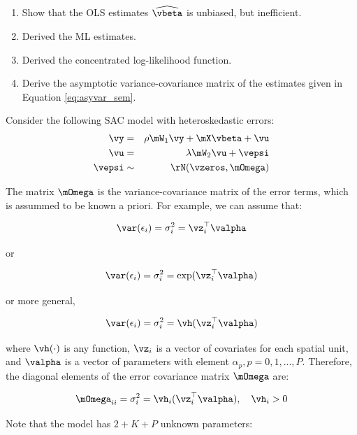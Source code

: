 \begin{exercises}
	\begin{enumerate}
	  \item Show that the OLS estimates $\widehat{\vbeta}$ is unbiased, but inefficient.
	  \item Derived the ML estimates.
	  \item Derived the concentrated log-likelihood function.
	  \item Derive the asymptotic variance-covariance matrix of the estimates given in Equation \eqref{eq:asyvar_sem}.
	\end{enumerate}
 
 \exercise  Consider the following SAC model with heteroskedastic errors:
 	\begin{eqnarray}
		\vy    & = & \rho \mW_1\vy + \mX\vbeta + \vu \\
		\vu & = &\lambda\mW_2\vu + \vepsi \\
		\vepsi & \sim &\rN(\vzeros, \mOmega)
	\end{eqnarray}
	
	The matrix $\mOmega$ is the variance-covariance matrix of the error terms, which is assummed to be known a priori. For example, we can assume that:
	
	\begin{equation}
		\var(\epsilon_i) = \sigma^2_i = \vz_i^\top\valpha
	\end{equation}
	
	or
	
	\begin{equation}
		\var(\epsilon_i) = \sigma^2_i = \exp(\vz_i^\top\valpha)
	\end{equation}
	
	or more general,
	
	\begin{equation}
		\var(\epsilon_i) = \sigma^2_i = \vh(\vz_i^\top\valpha)
	\end{equation}
	
	where $\vh(\cdot)$ is any function, $\vz_i$ is a vector of covariates for each spatial unit, and $\valpha$ is a vector of parameters with element $\alpha_p, p = 0, 1,..., P$.  Therefore, the diagonal elements of the error covariance  matrix $\mOmega$ are:
	
	
	\begin{equation}
		\mOmega_{ii} = \sigma^2_i = \vh_i(\vz^\top_i\valpha), \quad \vh_i > 0
	\end{equation}
	
	Note that the model has $2 + K + P$ unknown parameters:
	

\end{exercises}
